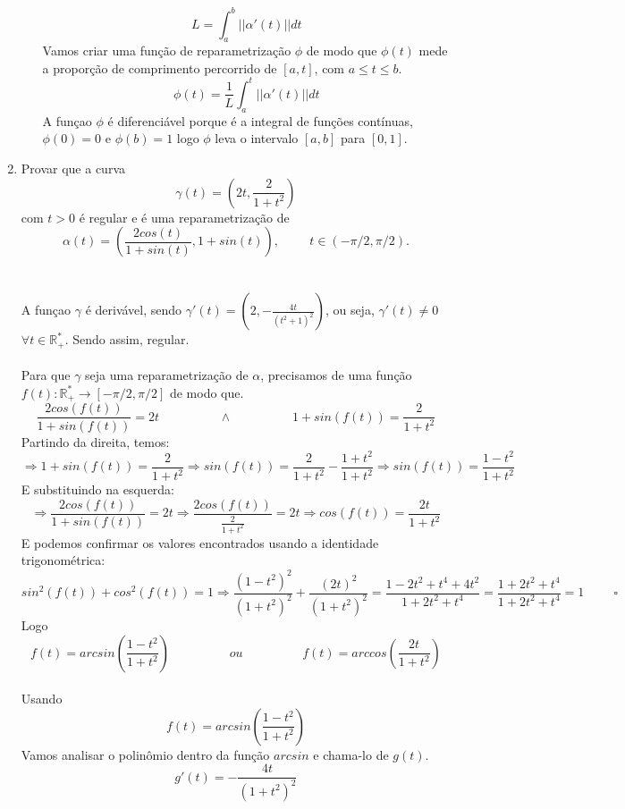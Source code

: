 \documentclass{article}
\begin{document}
\begin{enumerate}
\begin{enumerate}[label=(\alph*)]
        $$ L = \int_{a}^{b} ||\alpha'(t)|| dt $$
        Vamos criar uma função de reparametrização $\phi$ de modo que $\phi(t)$ mede a proporção de comprimento percorrido de $[a, t]$, com $a \leq t \leq b$. \\
        $$ \phi(t) = \frac{1}{L} \int_{a}^{t} ||\alpha'(t)|| dt $$
        A funçao $\phi$ é diferenciável porque é a integral de funções contínuas, $\phi(0) = 0$ e $\phi(b) = 1$ logo $\phi$ leva o intervalo $[a, b]$ para $[0, 1]$.
    \end{enumerate}
    \item Provar que a curva $$ \gamma(t) = (2t, \frac{2}{1+t^2}) $$ com $t > 0$ é regular e é uma reparametrização de $$ \alpha(t) = (\frac{2cos(t)}{1+sin(t)}, 1+sin(t)), \hspace{1cm} t \in (-\pi/2, \pi/2). $$ \\
    \\
    A funçao $\gamma$ é derivável, sendo $\gamma'(t) = (2, -\frac{4t}{(t^2 + 1)^2})$, ou seja, $\gamma'(t) \neq 0$ $\forall t \in \mathbb{R}_{+}^{*}$. Sendo assim, regular. \\
    \\
    Para que $\gamma$ seja uma reparametrização de $\alpha$, precisamos de uma função $ f(t) : \mathbb{R}_{+}^{*} \to [-\pi/2, \pi/2] $ de modo que. 
    $$ \frac{2cos(f(t))}{1+sin(f(t))} = 2t \hspace{2cm} \land \hspace{2cm} 1+sin(f(t)) = \frac{2}{1+t^2} $$
    Partindo da direita, temos:
    $$ \Rightarrow 1+sin(f(t)) = \frac{2}{1+t^2} \Rightarrow sin(f(t)) = \frac{2}{1+t^2} - \frac{1+t^2}{1+t^2} \Rightarrow sin(f(t)) = \frac{1-t^2}{1+t^2} $$
    E substituindo na esquerda:
    $$ \Rightarrow \frac{2cos(f(t))}{1+sin(f(t))} = 2t \Rightarrow \frac{2cos(f(t))}{\frac{2}{1+t^2}} = 2t \Rightarrow cos(f(t)) = \frac{2t}{1+t^2} $$
    E podemos confirmar os valores encontrados usando a identidade trigonométrica:
    $$ sin^2(f(t)) + cos^2(f(t)) = 1 \Rightarrow \frac{(1-t^2)^2}{(1+t^2)^2} + \frac{(2t)^2}{(1+t^2)^2} = \frac{1-2t^2+t^4+4t^2}{1+2t^2+t^4} = \frac{1+2t^2+t^4}{1+2t^2+t^4} = 1 \hspace{1cm} \square $$
    Logo
    $$ f(t) = arcsin(\frac{1-t^2}{1+t^2}) \hspace{2cm} ou \hspace{2cm} f(t) = arccos(\frac{2t}{1+t^2}) $$
    \\
    Usando
    $$ f(t) = arcsin(\frac{1-t^2}{1+t^2}) $$
    Vamos analisar o polinômio dentro da função $arcsin$ e chama-lo de $g(t)$.
    $$ g'(t) = -\frac{4t}{(1+t^2)^2} $$

\end{enumerate}
\end{document}
